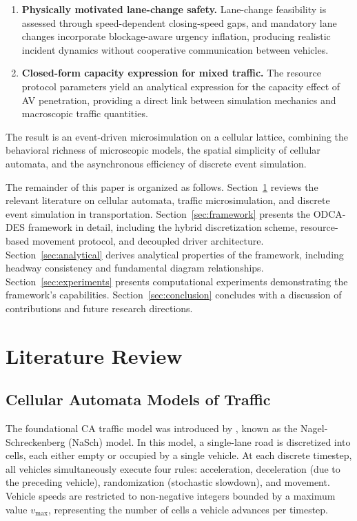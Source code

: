 \documentclass[review,authoryear]{elsarticle}
\begin{document}
\begin{enumerate}
    \item \textbf{Physically motivated lane-change safety.} Lane-change feasibility is assessed through speed-dependent closing-speed gaps, and mandatory lane changes incorporate blockage-aware urgency inflation, producing realistic incident dynamics without cooperative communication between vehicles.

    \item \textbf{Closed-form capacity expression for mixed traffic.} The resource protocol parameters yield an analytical expression for the capacity effect of AV penetration, providing a direct link between simulation mechanics and macroscopic traffic quantities.
\end{enumerate}

The result is an event-driven microsimulation on a cellular lattice, combining the behavioral richness of microscopic models, the spatial simplicity of cellular automata, and the asynchronous efficiency of discrete event simulation.

The remainder of this paper is organized as follows. Section~\ref{sec:literature} reviews the relevant literature on cellular automata, traffic microsimulation, and discrete event simulation in transportation. Section~\ref{sec:framework} presents the ODCA-DES framework in detail, including the hybrid discretization scheme, resource-based movement protocol, and decoupled driver architecture. Section~\ref{sec:analytical} derives analytical properties of the framework, including headway consistency and fundamental diagram relationships. Section~\ref{sec:experiments} presents computational experiments demonstrating the framework's capabilities. Section~\ref{sec:conclusion} concludes with a discussion of contributions and future research directions.


\section{Literature Review}
\label{sec:literature}

\subsection{Cellular Automata Models of Traffic}
\label{sec:lit_ca}

The foundational CA traffic model was introduced by \citet{nagel1992cellular}, known as the Nagel-Schreckenberg (NaSch) model. In this model, a single-lane road is discretized into cells, each either empty or occupied by a single vehicle. At each discrete timestep, all vehicles simultaneously execute four rules: acceleration, deceleration (due to the preceding vehicle), randomization (stochastic slowdown), and movement. Vehicle speeds are restricted to non-negative integers bounded by a maximum value $v_{\max}$, representing the number of cells a vehicle advances per timestep.
\end{document}
